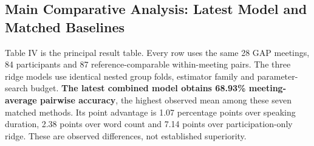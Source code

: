 \documentclass[journal]{IEEEtran}
\begin{document}
\subsection{Main Comparative Analysis: Latest Model and Matched Baselines}
Table IV is the principal result table. Every row uses the same 28 GAP meetings, 84 participants and 87 reference-comparable within-meeting pairs. The three ridge models use identical nested group folds, estimator family and parameter-search budget. \textbf{The latest combined model obtains 68.93\% meeting-average pairwise accuracy}, the highest observed mean among these seven matched methods. Its point advantage is 1.07 percentage points over speaking duration, 2.38 points over word count and 7.14 points over participation-only ridge. These are observed differences, not established superiority.
\end{document}
